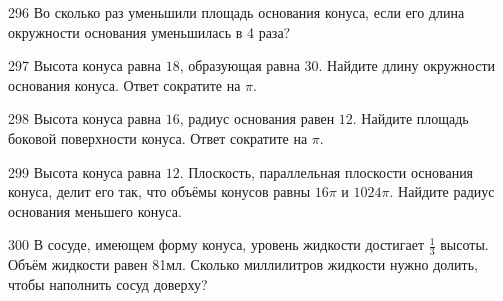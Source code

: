 \documentclass[a4paper]{article}
\begin{document}
\begin{taskBN}{296}
Во сколько раз уменьшили площадь основания конуса, если его длина окружности основания уменьшилась в 4 раза?
\end{taskBN}

\begin{taskBN}{297}
Высота конуса равна $18$, образующая равна $30$. Найдите длину окружности основания конуса. Ответ сократите на $\pi$.
\end{taskBN}

\begin{taskBN}{298}
Высота конуса равна $16$, радиус основания равен $12$. Найдите площадь боковой поверхности конуса. Ответ сократите на $\pi$.
\end{taskBN}

\begin{taskBN}{299}
Высота конуса равна $12$. Плоскость, параллельная плоскости основания конуса,  делит его так, что объёмы конусов равны $16\pi$ и $1024\pi$. Найдите радиус основания меньшего конуса. 
\end{taskBN}

\begin{taskBN}{300}
В сосуде, имеющем форму конуса, уровень жидкости достигает $\frac{1}{3}$ высоты. Объём жидкости равен 81мл. Сколько миллилитров жидкости нужно долить, чтобы наполнить сосуд доверху?
\end{taskBN}
\end{document}

